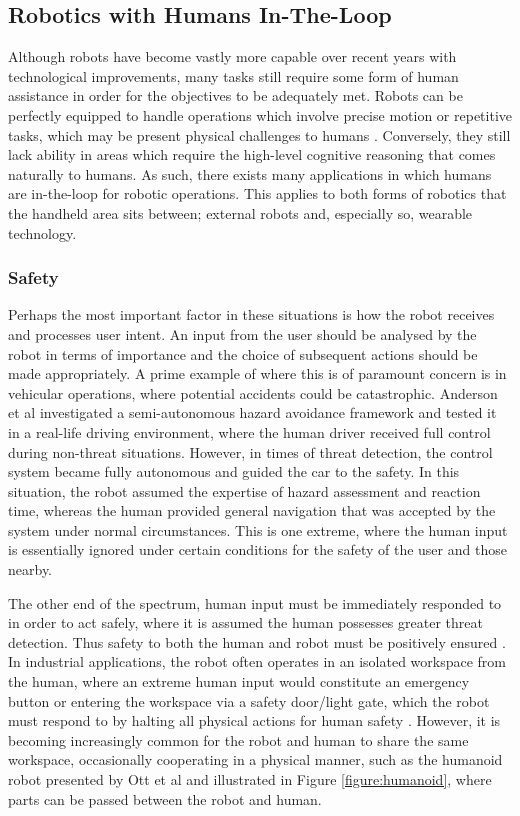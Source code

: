 \documentclass[11pt]{article}
\begin{document}
\subsection{Robotics with Humans In-The-Loop} \label{intheloop}

Although robots have become vastly more capable over recent years with technological improvements, many tasks still require some form of human assistance in order for the objectives to be adequately met. Robots can be perfectly equipped to handle operations which involve precise motion or repetitive tasks, which may be present physical challenges to humans \cite{Chipalkatty2012}. Conversely, they still lack ability in areas which require the high-level cognitive reasoning that comes naturally to humans. As such, there exists many applications in which humans are in-the-loop for robotic operations. This applies to both forms of robotics that the handheld area sits between; external robots and, especially so, wearable technology.  

\subsubsection{Safety}

Perhaps the most important factor in these situations is how the robot receives and processes user intent. An input from the user should be analysed by the robot in terms of importance and the choice of subsequent actions should be made appropriately. A prime example of where this is of paramount concern is in vehicular operations, where potential accidents could be catastrophic. Anderson et al \cite{Anderson2010} investigated a semi-autonomous hazard avoidance framework and tested it in a real-life driving environment, where the human driver received full control during non-threat situations. However, in times of threat detection, the control system became fully autonomous and guided the car to the safety. In this situation, the robot assumed the expertise of hazard assessment and reaction time, whereas the human provided general navigation that was accepted by the system under normal circumstances. This is one extreme, where the human input is essentially ignored under certain conditions for the safety of the user and those nearby. 

The other end of the spectrum, human input must be immediately responded to in order to act safely, where it is assumed the human possesses greater threat detection. Thus safety to both the human and robot must be positively ensured \cite{Haddadin2007}. In industrial applications, the robot often operates in an isolated workspace from the human, where an extreme human input would constitute an emergency button or entering the workspace via a safety door/light gate, which the robot must respond to by halting all physical actions for human safety \cite{ISOGuards}. However, it is becoming increasingly common for the robot and human to share the same workspace, occasionally cooperating in a physical manner, such as the humanoid robot presented by Ott et al \cite{Ott2006} and illustrated in Figure \ref{figure:humanoid}, where parts can be passed between the robot and human.
\end{document}
